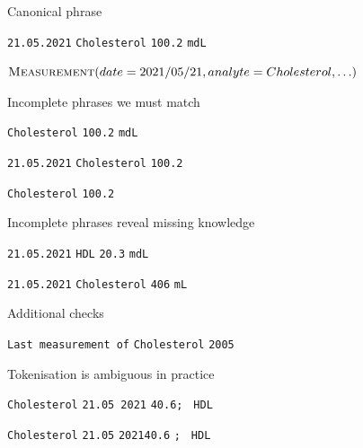 \documentclass[landscape,footrule]{foils}
\begin{document}

Canonical phrase \vspace*{2ex}

\centerline{
\colorbox{Orchid!80}{\texttt{21.05.2021}}
\colorbox{OliveGreen!80}{\texttt{Cholesterol}}
\colorbox{Orange!80}{\texttt{100.2}}
\colorbox{Red!80}{\texttt{mdL}}}
\centerline{}\vspace*{1.5ex}
\centerline{$\textsc{Measurement}(date=2021/05/21, analyte = Cholesterol, \ldots)$}
\vspace*{4ex}

Incomplete phrases we must match

\begin{triangles}
\item 
\colorbox{OliveGreen!80}{\texttt{Cholesterol}}
\colorbox{Orange!80}{\texttt{100.2}}
\colorbox{Red!80}{\texttt{mdL}}
\item 
\colorbox{Orchid!80}{\texttt{21.05.2021}}
\colorbox{OliveGreen!80}{\texttt{Cholesterol}}
\colorbox{Orange!80}{\texttt{100.2}}
\item 
\colorbox{OliveGreen!80}{\texttt{Cholesterol}}
\colorbox{Orange!80}{\texttt{100.2}}
\end{triangles}



Incomplete phrases reveal missing knowledge
\begin{triangles}
\item 
\colorbox{Orchid!80}{\texttt{21.05.2021}}
\colorbox{Gray!80}{\texttt{HDL}}
\colorbox{Orange!80}{\texttt{20.3}}
\colorbox{Red!80}{\texttt{mdL}}
\item 
\colorbox{Orchid!80}{\texttt{21.05.2021}}
\colorbox{OliveGreen!80}{\texttt{Cholesterol}}
\colorbox{Orange!80}{\texttt{406}}
\colorbox{Gray!80}{\texttt{mL}}
\vspace*{3ex}

\end{triangles}

Additional checks
\begin{triangles}
\item 
\texttt{Last measurement of}
\colorbox{OliveGreen!80}{\texttt{Cholesterol}}
\colorbox{Orange!80}{\texttt{2005}}

\end{triangles}
\vspace*{3ex}

Tokenisation is ambiguous in practice
\begin{triangles}
\item 
\colorbox{OliveGreen!80}{\texttt{Cholesterol}}
\colorbox{Orchid!80}{\texttt{21.05 2021}}
\colorbox{Orange!80}{\texttt{40.6}}\texttt{; }
\colorbox{OliveGreen!80}{\texttt{HDL}}
\item 
\colorbox{OliveGreen!80}{\texttt{Cholesterol}}
\colorbox{Orange!80}{\texttt{21.05}}
\texttt{2021\hspace*{1em}40.6}
\texttt{; }
\colorbox{OliveGreen!80}{\texttt{HDL}}
\end{triangles}
\end{document}
